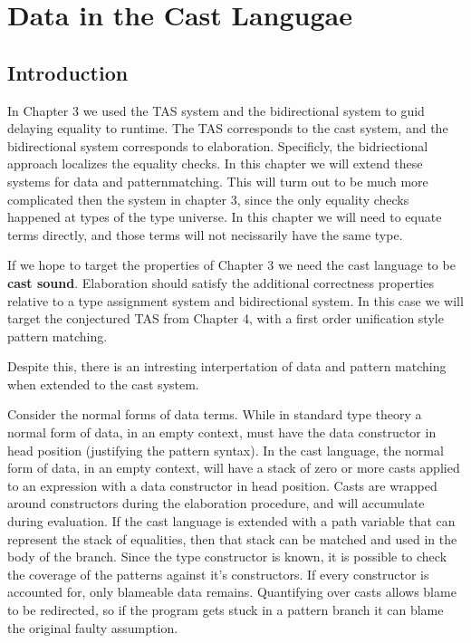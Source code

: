 \chapter{Data in the Cast Langugae}
\label{chapter:CastData}
\thispagestyle{myheadings}

\section{Introduction}

In Chapter 3 we used the TAS system and the bidirectional system to guid delaying equality to runtime.
The TAS corresponds to the cast system, and the bidirectional system corresponds to elaboration.
Specificly, the bidriectional approach localizes the equality checks.
In this chapter we will extend these systems for data and patternmatching.
This will turm out to be much more complicated then the system in chapter 3, since the only equality checks happened at types of the type universe.
In this chapter we will need to equate terms directly, and those terms will not necissarily have the same type.

If we hope to target the properties of Chapter 3 we need the cast language to be \textbf{cast sound}. 
Elaboration should satisfy the additional correctness properties relative to a type assignment system and bidirectional system.
In this case we will target the conjectured TAS from Chapter 4, with a first order unification style pattern matching. 

Despite this, there is an intresting interpertation of data and pattern matching when extended to the cast system.

Consider the normal forms of data terms.
While in standard type theory a normal form of data, in an empty context, must have the data constructor in head position (justifying the pattern syntax).
In the cast language, the normal form of data, in an empty context, will have a stack of zero or more casts applied to an expression with a data constructor in head position.
Casts are wrapped around constructors during the elaboration procedure, and will accumulate during evaluation.
If the cast language is extended with a path variable that can represent the stack of equalities, then that stack can be matched and used in the body of the branch.
Since the type constructor is known, it is possible to check the coverage of the patterns against it's constructors.
If every constructor is accounted for, only blameable data remains.
Quantifying over casts allows blame to be redirected, so if the program gets stuck in a pattern branch it can blame the original faulty assumption.

